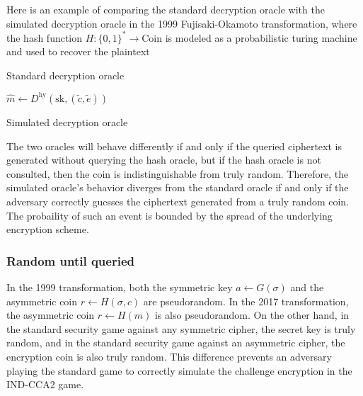 \documentclass{article}
\begin{document}
Here is an example of comparing the standard decryption oracle with the simulated decryption oracle in the 1999 Fujisaki-Okamoto transformation, where the hash function $H: \{0, 1\}^\ast \rightarrow \text{Coin}$ is modeled as a probabilistic turing machine and used to recover the plaintext

\begin{multicols}{2}
    \begin{algorithm}[H]
        \SetAlgoLined
        \caption{Standard decryption oracle}
        $\hat{m} \leftarrow D^\text{hy}(\text{sk}, (\tilde{c}, \tilde{e}))$\;
    \end{algorithm}


    \columnbreak

    \begin{algorithm}[H]
        \SetAlgoLined
        \caption{Simulated decryption oracle}
        \Return{$\bot$}\;
    \end{algorithm}
\end{multicols}

The two oracles will behave differently if and only if the queried ciphertext is generated without querying the hash oracle, but if the hash oracle is not consulted, then the coin is indistinguishable from truly random. Therefore, the simulated oracle's behavior diverges from the standard oracle if and only if the adversary correctly guesses the ciphertext generated from a truly random coin. The probaility of such an event is bounded by the spread of the underlying encryption scheme.

\subsubsection{Random until queried}\label{random-until-queried}
In the 1999 transformation, both the symmetric key $a \leftarrow G(\sigma)$ and the asymmetric coin $r \leftarrow H(\sigma, c)$ are pseudorandom. In the 2017 transformation, the asymmetric coin $r \leftarrow H(m)$ is also pseudorandom. On the other hand, in the standard security game against any symmetric cipher, the secret key is truly random, and in the standard security game against an asymmetric cipher, the encryption coin is also truly random. This difference prevents an adversary playing the standard game to correctly simulate the challenge encryption in the IND-CCA2 game.
\end{document}
